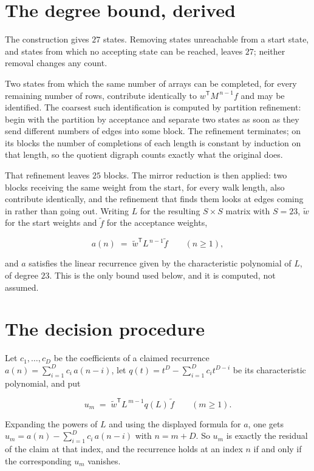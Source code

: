 \documentclass[11pt]{article}
\theoremstyle{definition}
\begin{document}
\section{The degree bound, derived}

The construction gives $27$ states. Removing states unreachable from a start state, and states from which no accepting state can be reached, leaves $27$; neither removal changes any count.

Two states from which the same number of arrays can be completed, for every remaining number of rows, contribute identically to $w^{\mathsf T}M^{\,n-1}f$ and may be identified. The coarsest such identification is computed by partition refinement: begin with the partition by acceptance and separate two states as soon as they send different numbers of edges into some block. The refinement terminates; on its blocks the number of completions of each length is constant by induction on that length, so the quotient digraph counts exactly what the original does.

That refinement leaves $25$ blocks. The mirror reduction is then applied: two blocks receiving the same weight from the start, for every walk length, also contribute identically, and the refinement that finds them looks at edges coming in rather than going out. Writing $L$ for the resulting $S \times S$ matrix with $S = 23$, $\tilde w$ for the start weights and $\tilde f$ for the acceptance weights,

\[a(n) \;=\; \tilde w^{\mathsf T} L^{\,n-1} \tilde f \qquad (n \ge 1),\]

and $a$ satisfies the linear recurrence given by the characteristic polynomial of $L$, of degree $23$. This is the only bound used below, and it is computed, not assumed.

\section{The decision procedure}

Let $c_1,\dots,c_D$ be the coefficients of a claimed recurrence $a(n) = \sum_{i=1}^{D} c_i\,a(n-i)$, let $q(t) = t^{D} - \sum_{i=1}^{D} c_i t^{D-i}$ be its characteristic polynomial, and put

\[u_m \;=\; \tilde w^{\mathsf T} L^{\,m-1} q(L)\,\tilde f \qquad (m \ge 1).\]

Expanding the powers of $L$ and using the displayed formula for $a$, one gets $u_m = a(n) - \sum_{i=1}^{D} c_i\,a(n-i)$ with $n = m + D$. So $u_m$ is exactly the residual of the claim at that index, and the recurrence holds at an index $n$ if and only if the corresponding $u_m$ vanishes.
\end{document}

